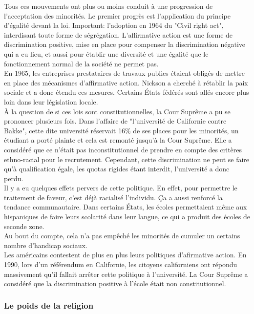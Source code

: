 \documentclass[10pt, a4paper, openany]{book}
\begin{document}
Tous ces mouvements ont plus ou moins conduit à une progression de l'acceptation des minorités. Le premier progrès est l'application du principe d'égalité devant la loi. Important: l'adoption en 1964 du "Civil right act", interdisant toute forme de ségrégation. L'affirmative action est une forme de discrimination positive, mise en place pour compenser la discrimination négative qui a eu lieu, et aussi pour établir une diversité et une égalité que le fonctionnement normal de la société ne permet pas. \\
En 1965, les entreprises prestataires de travaux publics étaient obligés de mettre en place des mécanismes d'affirmative action. Nickson a cherché à rétablir la paix sociale et a donc étendu ces mesures. Certains États fédérés sont allés encore plus loin dans leur législation locale. \\
À la question de si ces lois sont constitutionnelles, la Cour Suprême a pu se prononcer plusieurs fois. Dans l'affaire de "l'université de Californie contre Bakke", cette dite université réservait 16\% de ses places pour les minorités, un étudiant a porté plainte et cela est remonté jusqu'à la Cour Suprême. Elle a considéré que ce n'était pas inconstitutionnel de prendre en compte des critères ethno-racial pour le recrutement. Cependant, cette discrimination ne peut se faire qu'à qualification égale, les quotas rigides étant interdit, l'université a donc perdu. \\
Il y a eu quelques effets pervers de cette politique. En effet, pour permettre le traitement de faveur, c'est déjà racialisé l'individu. Ça a aussi renforcé la tendance communautaire. Dans certains États, les écoles permettaient même aux hispaniques de faire leurs scolarité dans leur langue, ce qui a produit des écoles de seconde zone. \\
Au bout du compte, cela n'a pas empêché les minorités de cumuler un certains nombre d'handicap sociaux. \\
Les américains contestent de plus en plus leurs politiques d'afirmative action. En 1990, lors d'un référendum en Californie, les citoyens californiens ont répondu massivement qu'il fallait arrêter cette politique à l'université. La Cour Suprême a considéré que la discrimination positive à l'école était non constitutionnel. 

\subsubsection{Le poids de la religion}
\end{document}
